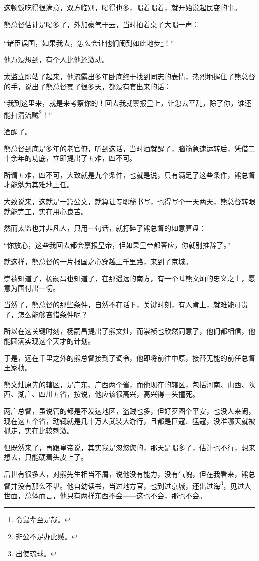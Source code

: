 \begin{multicols}{\theparacolNo}
这顿饭吃得很满意，双方临别，喝得也多，喝着喝着，就开始说起民变的事。

熊总督估计是喝多了，外加豪气干云，当时拍着桌子大喝一声：

“诸臣误国，如果我去，怎么会让他们闹到如此地步\footnote{令鼠辈至是哉。}！”

他万没想到，有个人比他还激动。

太监立即站了起来，他流露出多年卧底终于找到同志的表情，热烈地握住了熊总督的手，说出了熊总督套了很多天，都没有套出来的话：

“我到这里来，就是来考察你的！回去我就禀报皇上，让您去平乱，除了你，谁还能扫清流贼\footnote{非公不足办此贼。}！”

酒醒了。

熊总督到底是多年的老官僚，听到这话，当时酒就醒了，脑筋急速运转后，凭借二十余年的功底，立即提出了五难，四不可。

所谓五难，四不可，大致就是九个条件，也就是说，只有满足了这些条件，熊总督才能勉为其难地上任。

大致说来，这就是一篇公文，就算让专职秘书写，也得写个一天两天，熊总督转眼就能完工，实在用心良苦。

然而太监也并非凡人，只用一句话，就打碎了熊总督的如意算盘：

“你放心，这些我回去都会禀报皇帝，但如果皇帝都答应，你就别推辞了。”

就这样，熊总督的一片报国之心穿越上千里路，来到了京城。

崇祯知道了，杨嗣昌也知道了，在那遥远的南方，有一个叫熊文灿的忠义之士，愿意为国付出一切。

当然了，熊总督的那些条件，自然不在话下，关键时刻，有人肯上，就难能可贵了，怎么能够吝惜条件呢？

所以在这关键时刻，杨嗣昌提出了熊文灿，而崇祯也欣然同意了，他们都相信，他能圆满实现这个天才的计划。

于是，远在千里之外的熊总督接到了调令，他即将前往中原，接替无能的前任总督王家桢。

熊文灿原先的辖区，是广东、广西两个省，而他现在的辖区，包括河南、山西、陕西、湖广、四川五省，按说，他应该很高兴，高兴得一头撞死。

两广总督，虽说管的都是不发达地区，盗贼也多，但好歹图个平安，也没人来闹，现在这五个省，动辄就是几十万人武装大游行，且都是巨寇、猛寇，没准哪天就被抓走，实在比较刺激。

但既然来了，再跟皇帝说，其实我是忽悠您的，那天是喝多了，估计也不行，想来想去，只能硬着头皮上了。

后世有很多人，对熊先生相当不屑，说他没有能力，没有气魄，但在我看来，熊总督并没有那么不堪。他自幼读书，当过地方官，也到过京城，还出过海\footnote{出使琉球。}，见过大世面，总体而言，他只有两样东西不会——这也不会，那也不会。


\end{multicols}
